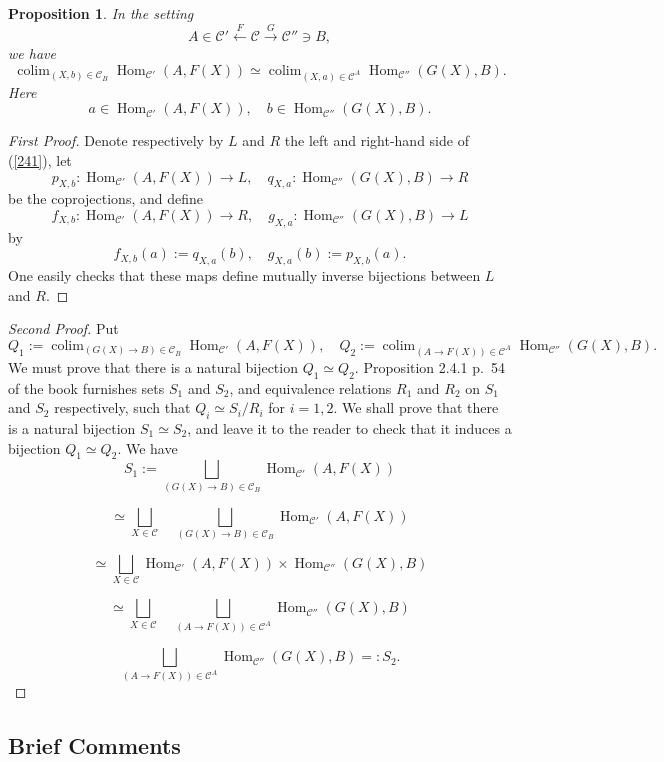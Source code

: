 \documentclass[12pt]{article}
\newtheorem{prop}[thm]{Proposition}
\theoremstyle{remark}
\theoremstyle{definition}
\newcommand{\C}{\mathcal C}
\DeclareMathOperator*{\colim}{colim}
\DeclareMathOperator{\Hom}{Hom}
\begin{document}
\begin{prop}\label{246}
In the setting 
%
\begin{equation}\label{241s}
A\in\C'\xleftarrow{F}\C\xrightarrow{G}\C''\ni B, 
\end{equation} 
%
we have 
%
\begin{equation}\label{241} 
\colim_{(X,b)\in\C_B}\Hom_{\C'}(A,F(X))\simeq\colim_{(X,a)\in\C^A}\Hom_{\C''}(G(X),B). 
\end{equation} 
%
Here 
$$
a\in\Hom_{\C'}(A,F(X)),\quad b\in\Hom_{\C''}(G(X),B). 
$$ 
\end{prop}

\begin{proof}[First Proof]
Denote respectively by $L$ and $R$ the left and right-hand side of (\ref{241}), let 
$$
p_{X,b}:\Hom_{\C'}(A,F(X))\to L,\quad q_{X,a}:\Hom_{\C''}(G(X),B)\to R
$$
be the coprojections, and define 
$$
f_{X,b}:\Hom_{\C'}(A,F(X))\to R,\quad g_{X,a}:\Hom_{\C''}(G(X),B)\to L
$$
by
$$
f_{X,b}(a):=q_{X,a}(b),\quad g_{X,a}(b):=p_{X,b}(a).
$$
One easily checks that these maps define mutually inverse bijections between $L$ and $R$. 
\end{proof}

\begin{proof}[Second Proof]
Put 
$$
Q_1:=\colim_{(G(X)\to B)\in\C_B}\Hom_{\C'}(A,F(X)),\quad Q_2:=\colim_{(A\to F(X))\in\C^A}\Hom_{\C''}(G(X),B).
$$ 
We must prove that there is a natural bijection $Q_1\simeq Q_2$. Proposition 2.4.1 p.~54 of the book furnishes sets $S_1$ and $S_2$, and equivalence relations $R_1$ and $R_2$ on $S_1$ and $S_2$ respectively, such that $Q_i\simeq S_i/R_i$ for $i=1,2$. We shall prove that there is a natural bijection $S_1\simeq S_2$, and leave it to the reader to check that it induces a bijection $Q_1\simeq Q_2$. We have 
$$
S_1:=\bigsqcup_{(G(X)\to B)\in\C_B}\Hom_{\C'}(A,F(X))
$$

$$
\simeq\bigsqcup_{X\in\C}\quad\bigsqcup_{(G(X)\to B)\in\C_B}\Hom_{\C'}(A,F(X))
$$

$$
\simeq\bigsqcup_{X\in\C}\Hom_{\C'}(A,F(X))\times\Hom_{\C''}(G(X),B)
$$

$$
\simeq\bigsqcup_{X\in\C}\quad\bigsqcup_{(A\to F(X))\in\C^A}\Hom_{\C''}(G(X),B)
$$

$$
\bigsqcup_{(A\to F(X))\in\C^A}\Hom_{\C''}(G(X),B)=:S_2.
$$
\end{proof}


\subsection{Brief Comments}
\end{document}
